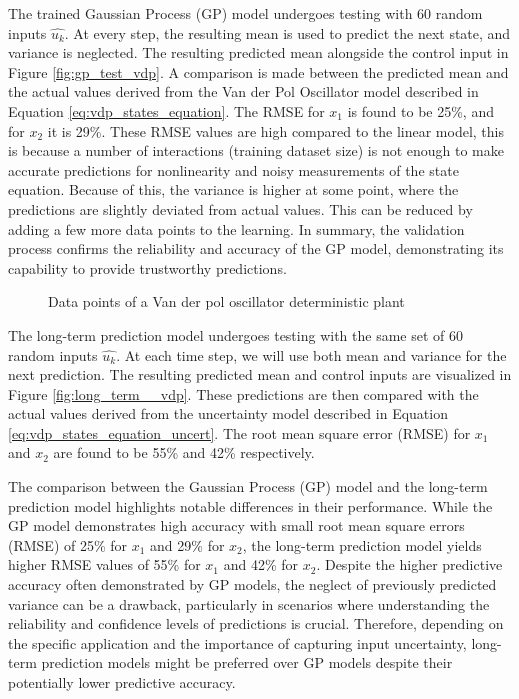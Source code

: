 The trained Gaussian Process (GP) model undergoes testing with 60 random inputs \( \hat{u_k} \). At every step, the resulting mean is used to predict the next state, and variance is neglected. The resulting predicted mean alongside the control input in Figure \ref{fig:gp_test_vdp}. A comparison is made between the predicted mean and the actual values derived from the Van der Pol Oscillator model described in Equation \ref{eq:vdp_states_equation}. The RMSE for \( x_1 \) is found to be 25\%, and for \( x_2 \) it is 29\%. These RMSE values are high compared to the linear model, this is because a number of interactions (training dataset size) is not enough to make accurate predictions for nonlinearity and noisy measurements of the state equation. Because of this, the variance is higher at some point, where the predictions are slightly deviated from actual values.  This can be reduced by adding a few more data points to the learning. In summary, the validation process confirms the reliability and accuracy of the GP model, demonstrating its capability to provide trustworthy predictions.

\begin{figure}
    \centering
    
    \caption{Data points of a Van der pol oscillator deterministic plant}
    \label{fig:data_points_with_noise_vdp}
\end{figure}

The long-term prediction model undergoes testing with the same set of 60 random inputs \( \hat{u_k} \). At each time step, we will use both mean and variance for the next prediction. The resulting predicted mean and control inputs are visualized in Figure \ref{fig:long_term__vdp}. These predictions are then compared with the actual values derived from the uncertainty model described in Equation \ref{eq:vdp_states_equation_uncert}. The root mean square error (RMSE) for \( x_1 \) and \( x_2 \) are found to be 55\% and 42\% respectively.

The comparison between the Gaussian Process (GP) model and the long-term prediction model highlights notable differences in their performance. While the GP model demonstrates high accuracy with small root mean square errors (RMSE) of 25\% for \( x_1 \) and 29\% for \( x_2 \), the long-term prediction model yields higher RMSE values of 55\% for \( x_1 \) and 42\% for \( x_2 \). Despite the higher predictive accuracy often demonstrated by GP models, the neglect of previously predicted variance can be a drawback, particularly in scenarios where understanding the reliability and confidence levels of predictions is crucial. Therefore, depending on the specific application and the importance of capturing input uncertainty, long-term prediction models might be preferred over GP models despite their potentially lower predictive accuracy.



